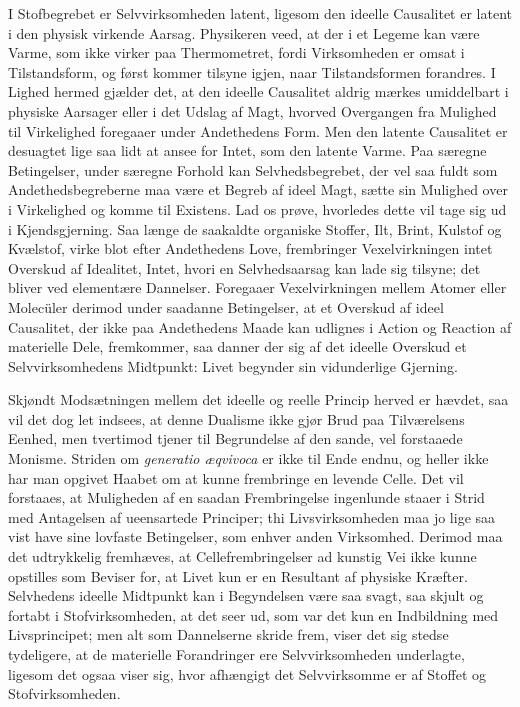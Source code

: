 \documentclass[12pt]{article}
\newcommand{\opage}[1]{\marginnote{\footnotesize\textit{[#1]}}}
\begin{document}
I Stofbegrebet er Selvvirksomheden latent, ligesom den ideelle
Causalitet er latent i den physisk virkende Aarsag. Physikeren veed,
at der i et Legeme kan være Varme, som ikke virker paa Thermometret,
fordi Virksomheden er omsat i Tilstandsform, og først kommer tilsyne
igjen, naar Tilstandsformen forandres. I Lighed hermed gjælder det,
at den ideelle Causalitet aldrig mærkes umiddelbart i physiske
Aarsager eller i det Udslag af Magt, hvorved Overgangen fra Mulighed
til Virkelighed foregaaer under Andethedens Form. Men den latente
Causalitet er desuagtet lige saa lidt at ansee for Intet, som den
latente Varme. Paa særegne Betingelser, under særegne Forhold kan
Selvhedsbegrebet, der vel saa fuldt som Andethedsbegreberne maa være
et Begreb af ideel Magt, sætte sin Mulighed over i Virkelighed og
komme til Existens. Lad os prøve, hvorledes dette vil tage sig ud i
Kjendsgjerning. Saa længe de saakaldte organiske Stoffer, Ilt,
Brint, Kulstof og Kvælstof, virke blot efter Andethedens Love,
frembringer Vexelvirkningen intet Overskud af Idealitet, Intet,
hvori en Selvhedsaarsag kan lade sig tilsyne; det bliver ved
elementære Dannelser. Foregaaer Vexelvirkningen mellem Atomer eller
Molecüler derimod under saadanne Betingelser, at et Overskud af
ideel Causalitet, der ikke paa Andethedens Maade kan udlignes i
Action og Reaction af materielle Dele, fremkommer, saa danner der
sig af det ideelle Overskud et Selvvirksomhedens Midtpunkt: Livet
begynder sin vidunderlige Gjerning.

Skjøndt Modsætningen mellem det ideelle og reelle Princip herved er
hævdet, saa vil det dog let indsees, at denne Dualisme ikke gjør
Brud paa Tilværelsens Eenhed, men tvertimod
\opage{58} tjener til Begrundelse af den sande, vel forstaaede Monisme. Striden
om \textit{generatio æqvivoca} er ikke til Ende endnu, og heller
ikke har man opgivet Haabet om at kunne frembringe en levende Celle.
Det vil forstaaes, at Muligheden af en saadan Frembringelse
ingenlunde staaer i Strid med Antagelsen af ueensartede Principer;
thi Livsvirksomheden maa jo lige saa vist have sine lovfaste
Betingelser, som enhver anden Virksomhed. Derimod maa det udtrykkelig
fremhæves, at Cellefrembringelser ad kunstig Vei ikke kunne
opstilles som Beviser for, at Livet kun er en Resultant af physiske
Kræfter. Selvhedens ideelle Midtpunkt kan i Begyndelsen være saa
svagt, saa skjult og fortabt i Stofvirksomheden, at det seer ud, som
var det kun en Indbildning med Livsprincipet; men alt som
Dannelserne skride frem, viser det sig stedse tydeligere, at de
materielle Forandringer ere Selvvirksomheden underlagte, ligesom det
ogsaa viser sig, hvor afhængigt det Selvvirksomme er af Stoffet og
Stofvirksomheden.
\end{document}
